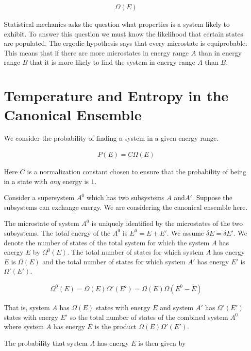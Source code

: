 \documentclass[12pt]{article}
\begin{document}
\begin{align}
\Omega(E)
\end{align}

Statistical mechanics asks the question what properties is a system likely to exhibit. To answer this question we must know the likelihood that certain states are populated. The ergodic hypothesis says that every microstate is equiprobable. This means that if there are more microstates in energy range $A$ than in energy range $B$ that it is more likely to find the system in energy range $A$ than $B$.

\section{Temperature and Entropy in the Canonical Ensemble}

We consider the probability of finding a system in a given energy range.

\begin{align}
P(E) = C \Omega(E)
\end{align}

Here $C$ is a normalization constant chosen to ensure that the probability of being in a state with \textit{any} energy is $1$.

Consider a supersystem $A^0$ which has two subsystems $A$ and$A'$. Suppose the subsystems can exchange energy. We are considering the canonical ensemble here.

The microstate of system $A^{0}$ is uniquely identified by the microstates of the two subsystems. The total energy of the $A^0$ is $E^0 = E + E'$. We assume $\delta E = \delta E'$. We denote the number of states of the total system for which the system $A$ has energy $E$ by $\Omega^0(E)$. The total number of states for which system $A$ has energy $E$ is $\Omega(E)$ and the total number of states for which system $A'$ has energy $E'$ is $\Omega'(E')$.

\begin{align}
\Omega^0(E) = \Omega(E)\Omega'(E') = \Omega(E)\Omega(E^0-E)
\end{align}

That is, system $A$ has $\Omega(E)$ states with energy $E$ and system $A'$ has $\Omega'(E')$ states with energy $E'$ so the total number of states of the combined system $A^0$ where system $A$ has energy $E$ is the product $\Omega(E)\Omega'(E')$.

The probability that system $A$ has energy $E$ is then given by
\end{document}

